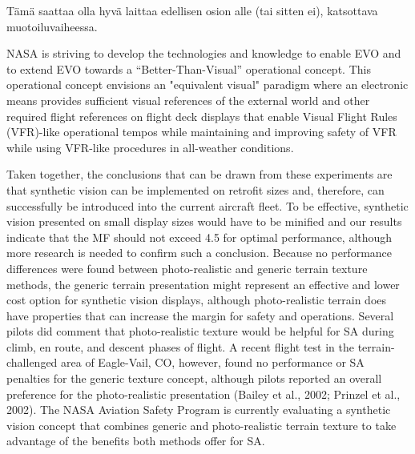 \documentclass[utf8,bachelor,manualbib]{gradu3}
\begin{document}
Tämä saattaa olla hyvä laittaa edellisen osion alle (tai sitten ei), katsottava muotoiluvaiheessa.

NASA is striving to develop the technologies and knowledge to enable EVO and to extend EVO towards a “Better-Than-Visual” operational concept. This operational concept envisions an "equivalent visual" paradigm where an electronic means provides sufficient visual references of the external world and other required flight references on flight deck displays that enable Visual Flight Rules (VFR)-like operational tempos while maintaining and improving safety of VFR while using VFR-like procedures in all-weather conditions.\citep{prinzel2013}

Taken together, the conclusions that can be drawn from these experiments are that
synthetic vision can be implemented on retrofit sizes and, therefore, can successfully
be introduced into the current aircraft fleet. To be effective, synthetic vision
presented on small display sizes would have to be minified and our results indicate
that the MF should not exceed 4.5 for optimal performance, although more research
is needed to confirm such a conclusion.
Because no performance differences were found between photo-realistic and
generic terrain texture methods, the generic terrain presentation might represent an
effective and lower cost option for synthetic vision displays, although photo-realistic
terrain does have properties that can increase the margin for safety and operations.
Several pilots did comment that photo-realistic texture would be helpful for
SA during climb, en route, and descent phases of flight. A recent flight test in the
terrain-challenged area of Eagle-Vail, CO, however, found no performance or SA
penalties for the generic texture concept, although pilots reported an overall preference
for the photo-realistic presentation (Bailey et al., 2002; Prinzel et al., 2002).
The NASA Aviation Safety Program is currently evaluating a synthetic vision concept
that combines generic and photo-realistic terrain texture to take advantage of
the benefits both methods offer for SA. \citep{prinzel2004}
\end{document}

